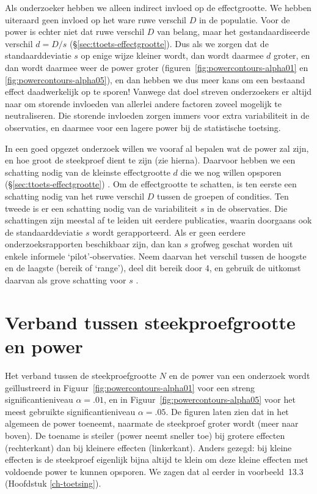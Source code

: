 \documentclass[
]{book}
\begin{document}
Als onderzoeker hebben we alleen indirect invloed op de effectgrootte.
We hebben uiteraard geen invloed op het ware ruwe verschil \(D\) in de
populatie. Voor de power is echter niet dat ruwe verschil \(D\) van
belang, maar het gestandaardiseerde verschil \(d=D/s\)
(§\ref{sec:ttoets-effectgrootte}). Dus als we zorgen dat de
standaarddeviatie \(s\) op enige wijze kleiner wordt, dan wordt daarmee
\(d\) groter, en dan wordt daarmee weer de power groter
(figuren~\ref{fig:powercontours-alpha01} en \ref{fig:powercontours-alpha05}),
en dan hebben we dus meer kans
om een bestaand effect daadwerkelijk op te sporen! Vanwege dat doel
streven onderzoekers er altijd naar om storende invloeden van allerlei
andere factoren zoveel mogelijk te neutraliseren. Die storende invloeden
zorgen immers voor extra variabiliteit in de observaties, en daarmee
voor een lagere power bij de statistische toetsing.

In een goed opgezet onderzoek willen we vooraf al bepalen wat de power
zal zijn, en hoe groot de steekproef dient te zijn (zie hierna).
Daarvoor hebben we een schatting nodig van de kleinste effectgrootte \(d\)
die we nog willen opsporen
(§\ref{sec:ttoets-effectgrootte}) \citep{Quene10}. Om de effectgrootte te
schatten, is ten eerste een schatting nodig van het ruwe verschil \(D\)
tussen de groepen of condities. Ten tweede is er een schatting nodig van
de variabiliteit \(s\) in de observaties. Die schattingen zijn meestal af
te leiden uit eerdere publicaties, waarin doorgaans ook de
standaarddeviatie \(s\) wordt gerapporteerd. Als er geen eerdere
onderzoeksrapporten beschikbaar zijn, dan kan \(s\) grofweg geschat worden
uit enkele informele `pilot'-observaties. Neem daarvan het verschil
tussen de hoogste en de laagste (bereik of `range'), deel dit bereik
door 4, en gebruik de uitkomst daarvan als grove schatting voor \(s\)
\citep{PD08}.

\section{Verband tussen steekproefgrootte en power}\label{sec:steekproefgrootte-power}

Het verband tussen de steekproefgrootte \(N\) en de power van een
onderzoek wordt geïllustreerd in
Figuur~\ref{fig:powercontours-alpha01} voor een streng
significantieniveau \(\alpha=.01\), en in
Figuur~\ref{fig:powercontours-alpha05} voor het meest gebruikte
significantieniveau \(\alpha=.05\). De figuren laten zien dat in het
algemeen de power toeneemt, naarmate de steekproef groter wordt (meer
naar boven). De toename is steiler (power neemt sneller toe) bij grotere
effecten (rechterkant) dan bij kleinere effecten (linkerkant). Anders gezegd: bij
kleine effecten is de steekproef eigenlijk bijna altijd te klein om deze
kleine effecten met voldoende power te kunnen opsporen. We zagen dat al
eerder in voorbeeld~13.3 (Hoofdstuk \ref{ch-toetsing}).
\end{document}
